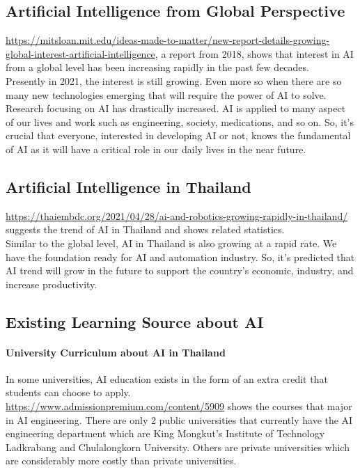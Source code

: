 \medskip
\subsection{Artificial Intelligence from Global Perspective}
\url{https://mitsloan.mit.edu/ideas-made-to-matter/new-report-details-growing-global-interest-artificial-intelligence}, a report from 2018, shows that interest in AI from a global level has been increasing rapidly in the past few decades.\\
Presently in 2021, the interest is still growing. Even more so when there are so many new technologies emerging that will require the power of AI to solve. Research focusing on AI has drastically increased. AI is applied to many aspect of our lives and work such as engineering, society, medications, and so on. So, it's crucial that everyone, interested in developing AI or not, knows the fundamental of AI as it will have a critical role in our daily lives in the near future.

\subsection{Artificial Intelligence in Thailand}
\url{https://thaiembdc.org/2021/04/28/ai-and-robotics-growing-rapidly-in-thailand/} \\ suggests the trend of AI in Thailand and shows related statistics.\\
Similar to the global level, AI in Thailand is also growing at a rapid rate. We have the foundation ready for AI and automation industry. So, it's predicted that AI trend will grow in the future to support the country's economic, industry, and increase productivity.

\subsection{Existing Learning Source about AI}
\paragraph{University Curriculum about AI in Thailand}
In some universities, AI education exists in the form of an extra credit that students can choose to apply.\\
\url{https://www.admissionpremium.com/content/5909} shows the courses that major in AI engineering. There are only 2 public universities that currently have the AI engineering department which are King Mongkut's Institute of Technology Ladkrabang and Chulalongkorn University. Others are private universities which are considerably more costly than private universities.

